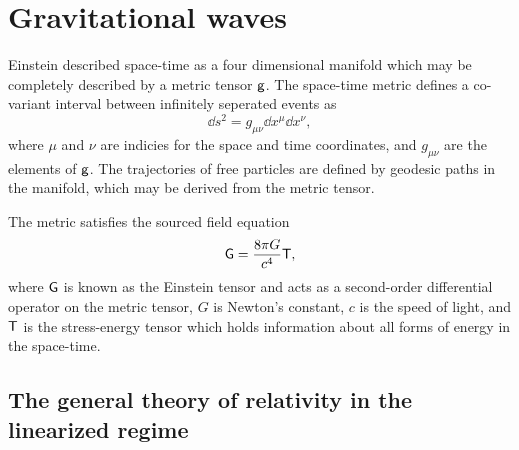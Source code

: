 \chapter{Gravitational waves}


Einstein described space-time as a four dimensional manifold which may be completely described by a metric tensor $\mathsf{g}$. %
The space-time metric defines a co-variant interval between infinitely seperated events as
\begin{equation}
\dd s^2 = g_{\mu \nu}\dd x^\mu \dd x^\nu,
\end{equation}
where $\mu$ and $\nu$ are indicies for the space and time coordinates, and $g_{\mu \nu}$ are the elements of $\mathsf{g}$. %
The trajectories of free particles are defined by geodesic paths in the manifold, which may be derived from the metric tensor.

The metric satisfies the sourced field equation
\begin{equation}
\mathsf{G}=\frac{8\pi G}{c^4}\mathsf{T},
\end{equation}
where $\mathsf{G}$ is known as the Einstein tensor and acts as a second-order differential operator on the metric tensor, $G$ is Newton's constant, $c$ is the speed of light, and $\mathsf{T}$ is the stress-energy tensor which holds information about all forms of energy in the space-time.

\section{The general theory of relativity in the linearized regime}

% 

